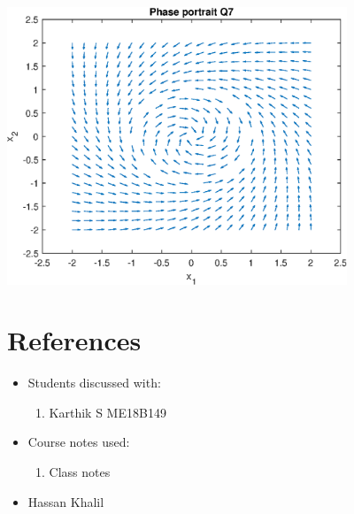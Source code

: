 \documentclass{article}
\begin{document}
\includegraphics [width=4in]{Q7_01.eps}
\section*{References}
\begin{itemize}
    \item Students discussed with:
    \begin{enumerate}
        \item Karthik S ME18B149
    \end{enumerate}
    \item Course notes used:
    \begin{enumerate}
        \item Class notes
    \end{enumerate}
    \item Hassan Khalil
\end{itemize}
\end{document}
